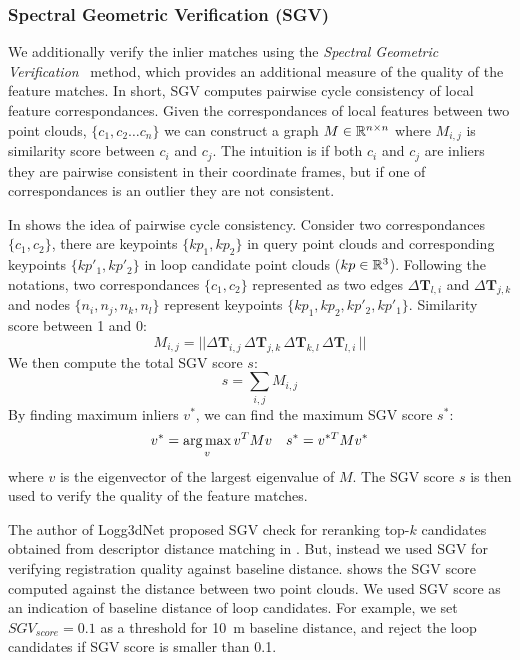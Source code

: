 \subsubsection*{\textbf{Spectral Geometric Verification (SGV)}}
We additionally verify the inlier matches using the \emph{Spectral Geometric Verification}~\cite{vidanapathirana2023ral} method, which provides an additional measure of the quality of the feature matches. In short, SGV computes pairwise cycle consistency of local feature correspondances. Given the correspondances of local features between two point clouds, $\{c_1, c_2 \ldots c_n\}$ we can construct a graph $M \in \mathbb{R}^{n \times n}$ where $M_{i,j}$ is similarity score between $c_i$ and $c_j$. The intuition is if both $c_i$ and $c_j$ are inliers they are pairwise consistent in their coordinate frames, but if one of correspondances is an outlier they are not consistent. 

In  shows the idea of pairwise cycle consistency. Consider two correspondances $\{c_1, c_2\}$, there are keypoints $\{kp_1, kp_2\}$ in query point clouds and corresponding keypoints $\{kp'_1, kp'_2\}$ in loop candidate point clouds ($kp \in \mathbb{R}^{3}$). Following the  notations, two correspondances $\{c_1, c_2\}$ represented as two edges $\Delta\mathbf{T}_{l,i}$ and $\Delta\mathbf{T}_{j,k}$ and nodes $\{n_i, n_j, n_k, n_l\}$ represent keypoints  $\{kp_1, kp_2, kp'_2, kp'_1\}$.
Similarity score between 1 and 0:
\begin{equation}
  M_{i,j} = ||\Delta\mathbf{T}_{i,j}\, \Delta\mathbf{T}_{j,k}\, \Delta\mathbf{T}_{k,l}\, \Delta\mathbf{T}_{l,i}\, ||
\end{equation}
We then compute the total SGV score $s$:
\begin{equation}
  s = \sum_{i,j} M_{i,j} 
\end{equation}
By finding maximum inliers $v^{*}$, we can find the maximum SGV score $s^{*}$: 
\begin{equation}
  v^{*} = \operatorname*{arg\,max}_{v} v^T M v \quad
  s^{*} = v^{*T} M v^{*}
\end{equation}
where $v$ is the eigenvector of the largest eigenvalue of $M$. The SGV score $s$ is then used to verify the quality of the feature matches.

The author of Logg3dNet proposed SGV check for reranking top-$k$ candidates obtained from descriptor distance matching in . But, instead we used SGV for verifying registration quality against baseline distance.  shows the SGV score computed against the distance between two point clouds. We used SGV score as an indication of baseline distance of loop candidates. For example, we set $SGV_{score}=0.1$ as a threshold for \SI{10}{\meter} baseline distance, and reject the loop candidates if SGV score is smaller than 0.1.


